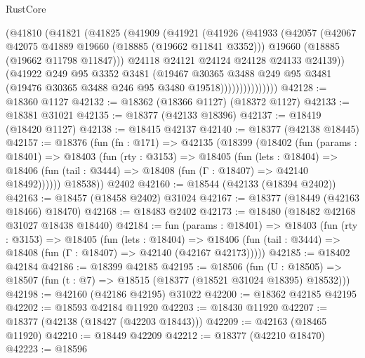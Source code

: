 \begin{lexlean}{RustCore}
\begin{coremodule}
                  (@41810
                    (@41821
                      (@41825
                        (@41909
                          (@41921
                            (@41926
                              (@41933
                                (@42057
                                  (@42067 @42075 @41889 @19660 (@18885 (@19662 @11841 @3352)))
                                  @19660
                                  (@18885 (@19662 @11798 @11847)))
                                @24118
                                @24121
                                @24124
                                @24128
                                @24133
                                @24139))
                            (@41922
                              @249
                              @95
                              @3352
                              @3481
                              (@19467
                                @30365
                                @3488
                                @249
                                @95
                                @3481
                                (@19476 @30365 @3488 @246 @95 @3480 @19518)))))))))))))))
@42128 := @18360 @1127
@42132 := @18362 (@18366 @1127) (@18372 @1127)
@42133 := @18381 @31021
@42135 := @18377 (@42133 @18396)
@42137 := @18419 (@18420 @1127)
@42138 := @18415 @42137
@42140 := @18377 (@42138 @18445)
@42157 := @18376
    (fun (fn : @171) =>
    @42135
      (@18399
        (@18402
          (fun (params : @18401) =>
          @18403
            (fun (rty : @3153) =>
            @18405
              (fun (lets : @18404) =>
              @18406 (fun (tail : @3444) => @18408 (fun (Γ : @18407) => @42140 @18492))))))
        @18538))
    @2402
@42160 := @18544 (@42133 (@18394 @2402))
@42163 := @18457 (@18458 @2402) @31024
@42167 := @18377 (@18449 (@42163 @18466) @18470)
@42168 := @18483 @2402
@42173 := @18480 (@18482 @42168 @31027 @18438 @18440)
@42184 := fun (params : @18401) =>
  @18403
    (fun (rty : @3153) =>
    @18405
      (fun (lets : @18404) =>
      @18406 (fun (tail : @3444) => @18408 (fun (Γ : @18407) => @42140 (@42167 @42173)))))
@42185 := @18402 @42184
@42186 := @18399 @42185
@42195 := @18506
    (fun (U : @18505) => @18507 (fun (t : @7) => @18515 (@18377 (@18521 @31024 @18395) @18532)))
@42198 := @42160 (@42186 @42195) @31022
@42200 := @18362 @42185 @42195
@42202 := @18593 @42184 @11920
@42203 := @18430 @11920
@42207 := @18377 (@42138 (@18427 (@42203 @18443)))
@42209 := @42163 (@18465 @11920)
@42210 := @18449 @42209
@42212 := @18377 (@42210 @18470)
@42223 := @18596

\end{coremodule}
\end{lexlean}

